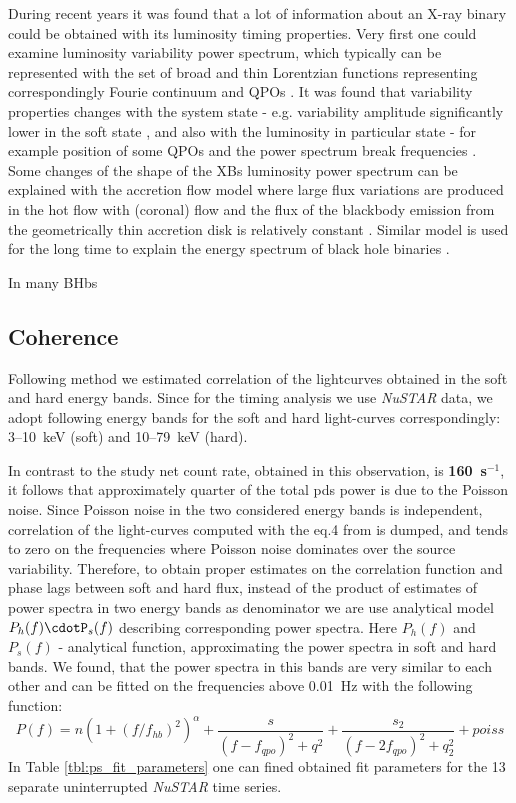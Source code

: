     During recent years it was found that a lot of information about an X-ray binary could be obtained with its luminosity timing properties.
Very first one could examine luminosity variability power spectrum, which typically can be represented with the set of broad and thin Lorentzian functions representing correspondingly Fourie continuum and QPOs \citep[see, e.g.][]{1972ApJ...174L..35T, 1990A&A...227L..33B}.
It was found that variability properties changes with the system state - e.g. variability amplitude significantly lower in the soft state \citep{},  and also with the luminosity in particular state - for example position of some QPOs and the power spectrum break frequencies \cite{1990A&A...227L..33B}. 
Some changes of the shape of the XBs luminosity power spectrum can be explained with the accretion flow model where large flux variations are produced in the hot flow with (coronal) flow and the flux of the blackbody emission from the geometrically thin accretion disk is relatively constant \citep{churazov}. 
Similar model is used for the long time to explain the energy spectrum of black hole binaries \citep{ederly74??}.
    
    In many BHbs


\subsection{Coherence}

Following method \citep{nowak99} we estimated correlation of the lightcurves obtained in the soft and hard energy bands. 
Since for the timing analysis we use {\it NuSTAR} data, we adopt following energy bands for the soft and hard light-curves correspondingly: 3--10~keV (soft) and 10--79~keV (hard).

In contrast to the \citep{nowak99} study net count rate, obtained in this observation, is {\bf 160~s$^{-1}$}, it follows that approximately quarter of the total pds power is due to the Poisson noise. 
Since Poisson noise in the two considered energy bands is independent, correlation of the light-curves computed with the eq.4 from \cite{Nowak99} is dumped, and tends to zero on the frequencies where Poisson noise dominates over the source variability.
Therefore, to obtain proper estimates on the correlation function and phase lags between soft and hard flux, instead of the product of estimates of power spectra in two energy bands as denominator we are use analytical model $P_{h}(f)\cdotP_{s}(f)$ describing corresponding power spectra. 
Here $P_h(f)$ and $P_s(f)$ - analytical function, approximating the power spectra in soft and hard bands.
We found, that the power spectra in this bands are very similar to each other and can be fitted on the frequencies above 0.01~Hz with the following function:
$$P(f) = n (1 + (f/f_{hb})^2)^{\alpha} + \frac{s}{(f - f_{qpo})^2 + q^2} +  \frac{s_2}{(f - 2f_{qpo})^2 + q_2^2} + poiss$$
In Table \ref{tbl:ps_fit_parameters} one can fined obtained fit parameters for the 13 separate uninterrupted {\it NuSTAR} time series.

